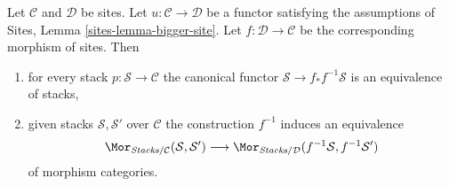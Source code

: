 \begin{lemma}
\label{lemma-bigger-site}
Let $\mathcal{C}$ and $\mathcal{D}$ be sites.
Let $u : \mathcal{C} \to \mathcal{D}$ be a functor satisfying the
assumptions of
Sites, Lemma \ref{sites-lemma-bigger-site}.
Let $f : \mathcal{D} \to \mathcal{C}$ be the corresponding
morphism of sites. Then
\begin{enumerate}
\item for every stack $p : \mathcal{S} \to \mathcal{C}$ the
canonical functor $\mathcal{S} \to f_*f^{-1}\mathcal{S}$ is
an equivalence of stacks,
\item given stacks $\mathcal{S}, \mathcal{S}'$ over $\mathcal{C}$
the construction $f^{-1}$
induces an equivalence
$$
\Mor_{\textit{Stacks}/\mathcal{C}}(\mathcal{S}, \mathcal{S}')
\longrightarrow
\Mor_{\textit{Stacks}/\mathcal{D}}(f^{-1}\mathcal{S}, f^{-1}\mathcal{S}')
$$
of morphism categories.
\end{enumerate}
\end{lemma}

